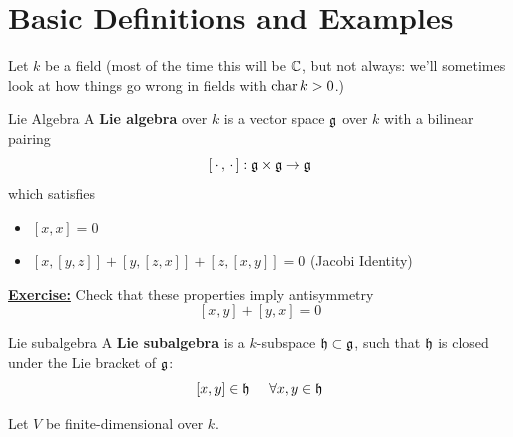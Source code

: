 \documentclass{article}
\begin{document}
\section{Basic Definitions and Examples}
Let $k$ be a field (most of the time this will be $\mathbb{C}$, but not always: we'll sometimes look at how things go wrong in fields with $\operatorname{char} k > 0$.)
\begin{fancydefine}{Lie Algebra}
    A \textbf{Lie algebra} over $k$ is a vector space $\mathfrak{g}$ over $k$ with a bilinear pairing
    \[
    [\, \cdot \,, \, \cdot \,]: \mathfrak{g} \times \mathfrak{g} \to \mathfrak{g} \]
    which satisfies
    \begin{itemize}
        \item $[x,x]=0$
        \item $[x,[y,z]] + [y,[z,x]] + [z,[x,y]] = 0$ \hspace{1cm} (Jacobi Identity)
    \end{itemize}
\end{fancydefine}
    \textbf{\underline{Exercise:}} Check that these properties imply antisymmetry
    \[ [x,y] + [y,x] = 0 \]
\begin{fancydefine}{Lie subalgebra}
     A \textbf{Lie subalgebra} is a $k$-subspace $\mathfrak{h} \subset \mathfrak{g}$, such that $\mathfrak{h}$ is closed under the Lie bracket of $\mathfrak{g}$: \[
[x,y] \in \mathfrak{h} \hspace{0.5cm} \forall x,y \in \mathfrak{h} \]
\end{fancydefine}
\ex Let $V$ be finite-dimensional over $k$.
\end{document}
